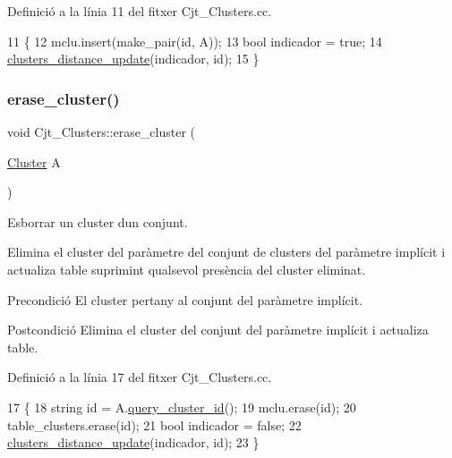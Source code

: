 Definició a la línia 11 del fitxer Cjt\+\_\+\+Clusters.\+cc.


\begin{DoxyCode}
11                                                           \{
12     mclu.insert(make\_pair(\textcolor{keywordtype}{id}, A));
13     \textcolor{keywordtype}{bool} indicador = \textcolor{keyword}{true};
14     \hyperlink{class_cjt___clusters_ad794d3d1b0df7adb7fbb35d21634f5a0}{clusters\_distance\_update}(indicador, \textcolor{keywordtype}{id});
15 \}   
\end{DoxyCode}
\mbox{\label{class_cjt___clusters_a779452d093c92ec42e47987a84ea48ff}} 
\subsubsection{\texorpdfstring{erase\+\_\+cluster()}{erase\_cluster()}}
{\footnotesize\ttfamily void Cjt\+\_\+\+Clusters\+::erase\+\_\+cluster (\begin{DoxyParamCaption}\item[{\hyperlink{class_cluster}{Cluster}}]{A }\end{DoxyParamCaption})}



Esborrar un cluster d\textquotesingle{}un conjunt. 

Elimina el cluster del paràmetre del conjunt de clusters del paràmetre implícit i actualiza table suprimint qualsevol presència del cluster eliminat.

\begin{DoxyPrecond}{Precondició}
El cluster pertany al conjunt del paràmetre implícit. 
\end{DoxyPrecond}
\begin{DoxyPostcond}{Postcondició}
Elimina el cluster del conjunt del paràmetre implícit i actualiza table. 
\end{DoxyPostcond}


Definició a la línia 17 del fitxer Cjt\+\_\+\+Clusters.\+cc.


\begin{DoxyCode}
17                                           \{
18     \textcolor{keywordtype}{string} \textcolor{keywordtype}{id} = A.\hyperlink{class_cluster_a7e077596f7eb4f2bdf2847d65fa37654}{query\_cluster\_id}();
19     mclu.erase(\textcolor{keywordtype}{id});
20     table\_clusters.erase(\textcolor{keywordtype}{id});
21     \textcolor{keywordtype}{bool} indicador = \textcolor{keyword}{false};
22     \hyperlink{class_cjt___clusters_ad794d3d1b0df7adb7fbb35d21634f5a0}{clusters\_distance\_update}(indicador, \textcolor{keywordtype}{id});
23 \}
\end{DoxyCode}
\mbox{\label{class_cjt___clusters_a35d2c4c28bee51017f4ac9049a0fe6e9}} 
